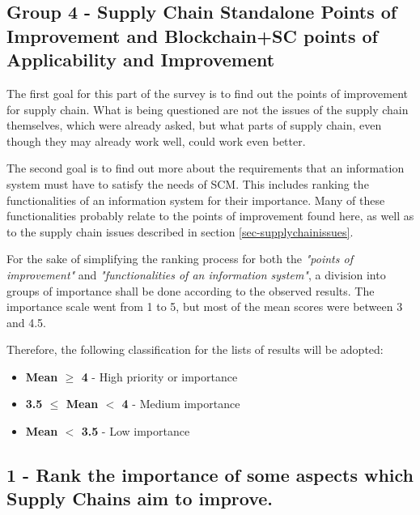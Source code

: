 
\subsection{Group 4 - Supply Chain Standalone Points of Improvement and Blockchain+SC points of Applicability and Improvement}

The first goal for this part of the survey is to find out the points of improvement for supply chain. What is being questioned are not the issues of the supply chain themselves, which were already asked, but what parts of supply chain, even though they may already work well, could work even better.

The second goal is to find out more about the requirements that an information system must have to satisfy the needs of SCM. This includes ranking the functionalities of an information system for their importance. Many of these functionalities probably relate to the points of improvement found here, as well as to the supply chain issues described in section \ref{sec-supplychainissues}.




For the sake of simplifying the ranking process for both the \textit{"points of improvement"} and \textit{"functionalities of an information system"}, a division into groups of importance shall be done according to the observed results. The importance scale went from 1 to 5, but most of the mean scores were between 3 and 4.5. 

Therefore, the following classification for the lists of results will be adopted: 

\begin{itemize}
    \item \textbf{Mean 	$\geq$ 4} - High priority or importance
    \item \textbf{3.5 $\leq$ Mean $<$ 4} - Medium importance 
    \item \textbf{Mean $<$ 3.5} - Low importance
\end{itemize}

\subsection*{1 - Rank the importance of some aspects which Supply Chains aim to improve.}
 
